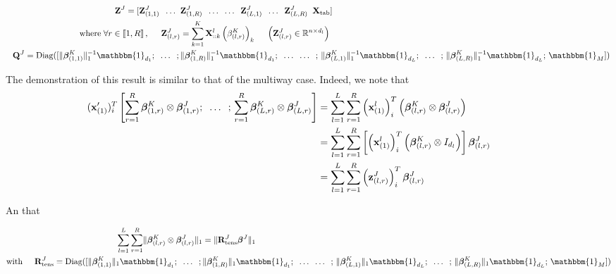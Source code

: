 \documentclass[10pt]{article}
\begin{document}
\begin{align}
\mathbf{Z}^J = [ \mathbf{Z}_{(1,1)}^J \; \; \hdots \; \; &\mathbf{Z}_{(1,R)}^J  \; \; \hdots  \; \; \hdots \; \; \mathbf{Z}_{(L,1)}^J \; \; \hdots \; \; \mathbf{Z}_{(L,R)}^J \; \; \mathbf{X}_{\text{tab}}] \label{eqref: Z_j}\\
\text{where} \; \forall r \in \llbracket 1, R\rrbracket\, , \hspace{0.5 cm} \mathbf{Z}_{(l,r)}^J &= \sum\limits_{k = 1}^K \mathbf{X}^l_{::k} \left(\beta_{(l,r)}^K\right)_k \hspace{0.5 cm} \left(\mathbf{Z}_{(l,r)}^J \in \mathbb{R}^{n \times d_l}\right) \label{eqref: Z_r}\\
\hspace{7 pt}
\mathbf{Q}^J = \text{Diag}([\lVert \bm{\beta}_{(1,1)}^K \rVert_1^{-1} \mathbbm{1}_{d_1}; \; \; \hdots \; \;; \,& \lVert \bm{\beta}_{(1,R)}^K \rVert_1^{-1} \mathbbm{1}_{d_1};  \; \; \hdots \; \;  \hdots \; \; ;\, \lVert \bm{\beta}_{(L,1)}^K \rVert_1^{-1} \mathbbm{1}_{d_L};  \; \;  \hdots \; \; ;\, \lVert \bm{\beta}_{(L,R)}^K \rVert_1^{-1} \mathbbm{1}_{d_L}; \, \mathbbm{1}_M]) \label{eqref:Q^J}
\end{align}

The demonstration of this result is similar to that of the multiway case. Indeed, we note that
\begin{align}
    \hspace{-40 pt}(\mathbf{x}_{(1)}')_i^T \left[ \sum\limits_{r = 1}^R \bm{\beta}_{(1,r)}^K \otimes \bm{\beta}_{(1,r)}^J;   \; \; \hdots  \; \; ;\, \sum\limits_{r = 1}^R \bm{\beta}_{(L,r)}^K \otimes \bm{\beta}_{(L,r)}^J \right] &= \sum\limits_{l = 1}^L \sum\limits_{r = 1}^R \left(\mathbf{x}_{(1)}^l\right)_i^T \left(\bm{\beta}_{(l,r)}^K \otimes \bm{\beta}_{(l,r)}^J \right)\\
    &= \sum\limits_{l = 1}^L \sum\limits_{r = 1}^R \left[ \left(\mathbf{x}_{(1)}^l\right)_i^T \left( \bm{\beta}_{(l,r)}^K \otimes I_{d_l} \right) \right]\bm{\beta}_{(l,r)}^J\\ 
    &= \sum\limits_{l = 1}^L \sum\limits_{r = 1}^R \left(\mathbf{z}_{(l,r)}^J\right)_i^T \bm{\beta}_{(l,r)}^J
\end{align}

An that

\begin{align}
    \sum\limits_{l = 1}^L \sum\limits_{r = 1}^R \lVert \bm{\beta}_{(l,r)}^K \otimes \bm{\beta}_{(l,r)}^J \rVert_1 &= \lVert \mathbf{R}_{\text{tens}}^J \bm{\beta}^J\rVert_1\\
    \text{with} \hspace{0.5 cm} \mathbf{R}_{\text{tens}}^J = \text{Diag}    ([\lVert \bm{\beta}_{(1,1)}^K \rVert_1 \mathbbm{1}_{d_1}; \; \; \hdots \; \;; \,& \lVert \bm{\beta}_{(1,R)}^K \rVert_1 \mathbbm{1}_{d_1};  \; \; \hdots \; \;  \hdots \; \; ;\, \lVert \bm{\beta}_{(L,1)}^K \rVert_1 \mathbbm{1}_{d_L};  \; \;  \hdots \; \; ;\, \lVert \bm{\beta}_{(L,R)}^K \rVert_1 \mathbbm{1}_{d_L}; \, \mathbbm{1}_M])
\end{align}
\end{document}
